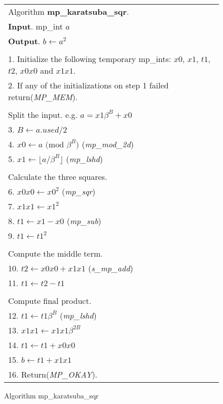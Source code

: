 \documentclass[b5paper]{book}
\begin{document}
\newpage\begin{figure}[!here]
\begin{small}
\begin{center}
\begin{tabular}{l}
\hline Algorithm \textbf{mp\_karatsuba\_sqr}. \\
\textbf{Input}.   mp\_int $a$ \\
\textbf{Output}.  $b \leftarrow a^2$ \\
\hline \\
1.  Initialize the following temporary mp\_ints:  $x0$, $x1$, $t1$, $t2$, $x0x0$ and $x1x1$. \\
2.  If any of the initializations on step 1 failed return(\textit{MP\_MEM}). \\
\\
Split the input.  e.g. $a = x1\beta^B + x0$ \\
3.  $B \leftarrow a.used / 2$ \\
4.  $x0 \leftarrow a \mbox{ (mod }\beta^B\mbox{)}$ (\textit{mp\_mod\_2d}) \\
5.  $x1 \leftarrow \lfloor a / \beta^B \rfloor$ (\textit{mp\_lshd}) \\
\\
Calculate the three squares. \\
6.  $x0x0 \leftarrow x0^2$ (\textit{mp\_sqr}) \\
7.  $x1x1 \leftarrow x1^2$ \\
8.  $t1 \leftarrow x1 - x0$ (\textit{mp\_sub}) \\
9.  $t1 \leftarrow t1^2$ \\
\\
Compute the middle term. \\
10.  $t2 \leftarrow x0x0 + x1x1$ (\textit{s\_mp\_add}) \\
11.  $t1 \leftarrow t2 - t1$ \\
\\
Compute final product. \\
12.  $t1 \leftarrow t1\beta^B$ (\textit{mp\_lshd}) \\
13.  $x1x1 \leftarrow x1x1\beta^{2B}$ \\
14.  $t1 \leftarrow t1 + x0x0$ \\
15.  $b \leftarrow t1 + x1x1$ \\
16.  Return(\textit{MP\_OKAY}). \\
\hline
\end{tabular}
\end{center}
\end{small}
\caption{Algorithm mp\_karatsuba\_sqr}
\end{figure}
\end{document}
